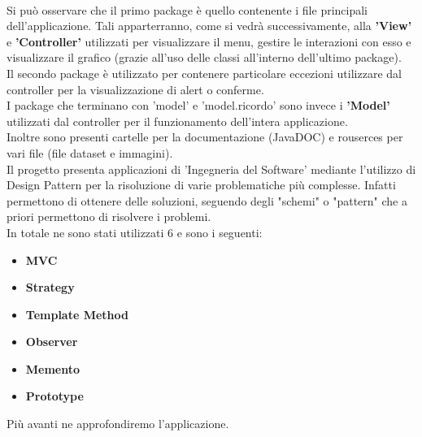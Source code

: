\documentclass[a4paper, oneside]{book}
\begin{document}
\\
Si può osservare che il primo package è quello contenente i file principali dell'applicazione. Tali apparterranno, come si vedrà successivamente, alla \textbf{'View'} e \textbf{'Controller'} utilizzati per visualizzare il menu, gestire le interazioni con esso e visualizzare il grafico (grazie all'uso delle classi all'interno dell'ultimo package).\\
Il secondo package è utilizzato per contenere particolare eccezioni utilizzare dal controller per la visualizzazione di alert o conferme.\\
I package che terminano con 'model' e 'model.ricordo' sono invece i \textbf{'Model'} utilizzati dal controller per il funzionamento dell'intera applicazione.
\\ 
Inoltre sono presenti cartelle per la documentazione (JavaDOC) e rouserces per vari file (file dataset e immagini).
\\
Il progetto presenta applicazioni di 'Ingegneria del Software' mediante l'utilizzo di Design Pattern per la risoluzione di varie problematiche più complesse. Infatti permettono di ottenere delle soluzioni, seguendo degli "schemi" o "pattern" che a priori permettono di risolvere i problemi.\\
\newpage
In totale ne sono stati utilizzati 6 e sono i seguenti:
     \begin{itemize}
        \item{\textbf{MVC}}
        \item{\textbf{Strategy}}
        \item{\textbf{Template Method}}
        \item{\textbf{Observer}}
                \item{\textbf{Memento}}
                        \item{\textbf{Prototype}}
      \end{itemize}
Più avanti ne approfondiremo l'applicazione.


\newpage
\end{document}
